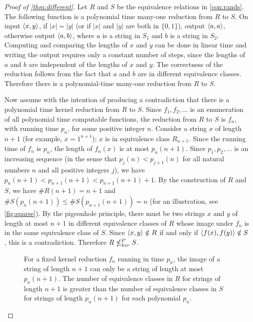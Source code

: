 \begin{proof}[Proof of \autoref{thm:different}]
  Let $R$ and $S$ be the equivalence relations in \autoref{con:rands}.
  The following function is a polynomial time many-one reduction from $R$ to $S$.
  On input $\langle x,y\rangle$, if $|x| = |y|$ (or if $|x|$ and $|y|$ are both in $\{0, 1\}$), output $\langle a,a\rangle$, otherwise output $\langle a,b\rangle$, where $a$ is a string in $S_1$ and $b$ is a string in $S_2$.
  Computing and comparing the lengths of $x$ and $y$ can be done in linear time and writing the output requires only a constant number of steps, since the lengths of $a$ and $b$ are independent of the lengths of $x$ and $y$.
  The correctness of the reduction follows from the fact that $a$ and $b$ are in different equivalence classes.
  Therefore there is a polynomial-time many-one reduction from $R$ to $S$.

  Now assume with the intention of producing a contradiction that there is a polynomial time kernel reduction from $R$ to $S$.
  Since $f_1, f_2, \dotsc$ is an enumeration of all polynomial time computable functions, the reduction from $R$ to $S$ is $f_n$, with running time $p_n$, for some positive integer $n$.
  Consider a string $x$ of length $n + 1$ (for example, $x = 1^{n + 1}$); $x$ is in equivalence class $R_{n + 1}$.
  Since the running time of $f_n$ is $p_n$, the length of $f_n(x)$ is at most $p_n(n + 1)$.
  Since $p_1, p_2, \dotsc$ is an increasing sequence (in the sense that $p_j(n) < p_{j + 1}(n)$ for all natural numbers $n$ and all positive integers $j$), we have $p_n(n + 1) < p_{n + 1}(n + 1) < p_{n + 1}(n + 1) + 1$.
  By the construction of $R$ and $S$, we have $\#R(n + 1) = n + 1$ and $\#S(p_n(n + 1)) \leq \#S(p_{n + 1}(n + 1)) = n$ (for an illustration, see \autoref{fig:sparse}).
  By the pigeonhole principle, there must be two strings $x$ and $y$ of length at most $n + 1$ in different equivalence classes of $R$ whose image under $f_n$ is in the same equivalence class of $S$.
  Since $\langle x,y\rangle \notin R$ if and only if $\langle f(x),f(y)\rangle \notin S$, this is a contradiction.
  Therefore $R \nleq^{P}_{ker} S$.

  \begin{figure}
    \caption{\label{fig:sparse}For a fixed kernel reduction $f_n$ running in time $p_n$, the image of a string of length $n + 1$ can only be a string of length at most $p_n(n + 1)$.
      The number of equivalence classes in $R$ for strings of length $n + 1$ is greater than the number of equivalence classes in $S$ for strings of length $p_n(n + 1)$ for each polynomial $p_n$.}
    \begin{center}
\end{center}
\end{figure}
\end{proof}
